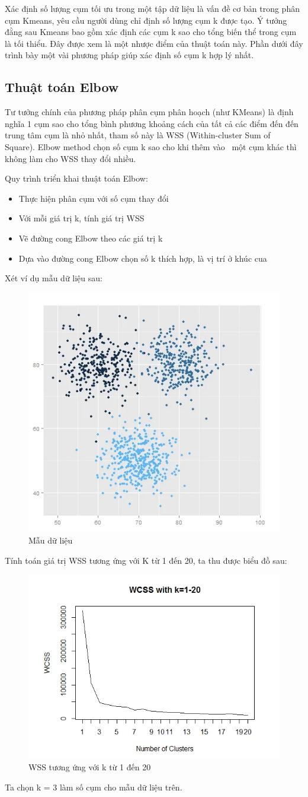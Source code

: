 Xác định số lượng cụm tối ưu trong một tập dữ liệu là vấn đề cơ bản trong phân cụm Kmeans, yêu cầu người dùng chỉ định số lượng cụm k được tạo. Ý tưởng đằng sau Kmeans bao gồm xác định các cụm k sao cho tổng biến thể trong cụm là tối thiểu. Đây được xem là một nhược điểm của thuật toán này. Phần dưới đây trình bày một vài phương pháp giúp xác định số cụm k hợp lý nhất.\par
\subsection{Thuật toán Elbow}
Tư tưởng chính của phương pháp phân cụm phân hoạch (như KMeans) là định nghĩa 1 cụm sao cho tổng bình phương khoảng cách của tất cả các điểm đến đến trung tâm cụm là nhỏ nhất, tham số này là WSS (Within-cluster Sum of Square). Elbow method chọn số cụm k sao cho khi thêm vào  một cụm khác thì không làm cho WSS thay đổi nhiều.\par
\smallskip
Quy trình triển khai thuật toán Elbow:
\begin{itemize}
	\item Thực hiện phân cụm với số cụm thay đổi
	\item Với mỗi giá trị k, tính giá trị WSS
	\item Vẽ đường cong Elbow theo các giá trị k
	\item Dựa vào đường cong Elbow chọn số k thích hợp, là vị trí ở khúc cua 
\end{itemize}
\newpage
Xét ví dụ mẫu dữ liệu sau:
\begin{figure}[h]
	\centering
	\includegraphics[width=0.5\linewidth]{img/data_set_1}
	\caption{Mẫu dữ liệu}
\end{figure}\par
Tính toán giá trị WSS tương ứng với K từ 1 đến 20, ta thu được biểu đồ sau:
\begin{figure}[h]
	\centering
	\includegraphics[width=0.6\linewidth]{img/data_set_2}
	\caption{WSS tương ứng với k từ 1 đến 20}
\end{figure}\par
Ta chọn k = 3 làm số cụm cho mẫu dữ liệu trên.
\newpage
